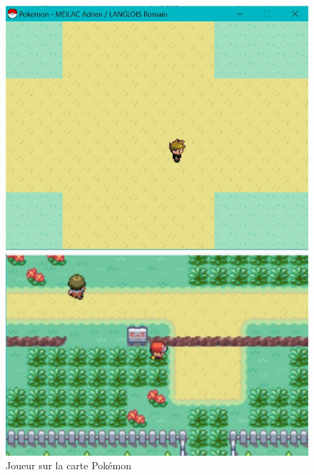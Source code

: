 \documentclass[a4paper,twoside, openany,11pt]{book}
\begin{document}
\begin{figure}[!h]
\begin{minipage}{0.49\textwidth}
\includegraphics[scale = 0.6]{Images/map.jpg}
\end{minipage}
\begin{minipage}{0.49\textwidth}
\includegraphics[scale = 0.84]{Images/vrai_jeu_map.jpg}
\end{minipage}
\caption{Joueur sur la carte Pokémon}
\end{figure}
\end{document}
